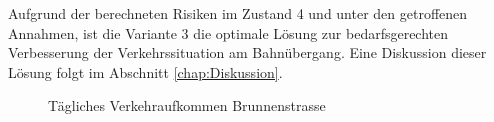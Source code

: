 Aufgrund der berechneten Risiken im Zustand 4 und unter den getroffenen Annahmen, ist die Variante 3 die optimale Lösung zur bedarfsgerechten Verbesserung der Verkehrssituation am Bahnübergang. Eine Diskussion dieser Lösung folgt im Abschnitt \ref{chap:Diskussion}.

\begin{figure}[h!]
  \centering
  \hfill
\caption[Verkehrsaufkommen]{Tägliches Verkehraufkommen Brunnenstrasse}
  \label{fig:Z4}
\end{figure}



%

